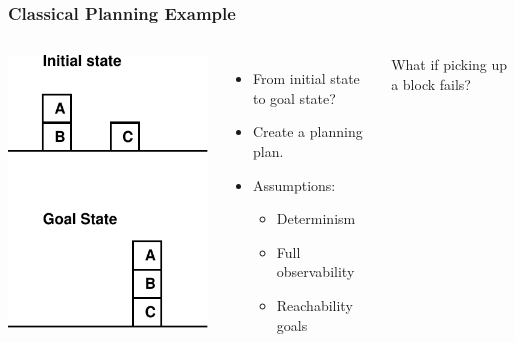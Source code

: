 \documentclass{beamer}
\let\origframetitle=\frametitle
\renewcommand\frametitle[1]{\origframetitle{\textbf{\large{\textrm{#1}}}}}
\begin{document}
\begin{frame}
  \frametitle{Classical Planning Example}

  \begin{columns}
    \includegraphics[width=\textwidth]{../presentation-plan/blocksworld.pdf}


    \begin{itemize}
      \item From initial state to goal state?
      \item Create a planning plan.
      \item Assumptions:
        \begin{itemize}
          \item Determinism
          \item Full observability
          \item Reachability goals
        \end{itemize}
    \end{itemize}

     {What if picking up a block fails?}

  \end{columns}

\end{frame}
\end{document}
